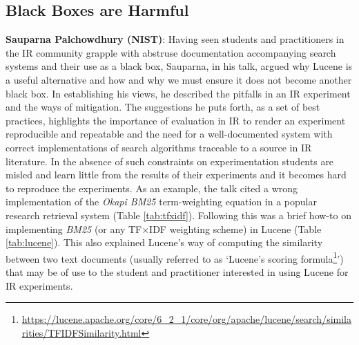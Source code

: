 \subsection*{Black Boxes are Harmful}

{\bf Sauparna Palchowdhury (NIST)}: Having seen students and
practitioners in the IR community grapple with abstruse documentation
accompanying search systems and their use as a black box, Sauparna, in
his talk, argued why Lucene is a useful alternative and how and why we
must ensure it does not become another black box. In establishing his
views, he described the pitfalls in an IR experiment and the ways of
mitigation. The suggestions he puts forth, as a set of best practices,
highlights the importance of evaluation in IR to render an experiment
reproducible and repeatable and the need for a well-documented system
with correct implementations of search algorithms traceable to a
source in IR literature. In the absence of such constraints on
experimentation students are misled and learn little from the results
of their experiments and it becomes hard to reproduce the
experiments. As an example, the talk cited a wrong implementation of
the \emph{Okapi BM25} term-weighting equation in a popular research
retrieval system (Table \ref{tab:tfxidf}). Following this was a brief
how-to on implementing \emph{BM25} (or any TF$\times$IDF weighting
scheme) in Lucene (Table \ref{tab:lucene}). This also explained
Lucene's way of computing the similarity between two text documents
(usually referred to as `Lucene's scoring
formula\footnote{\url{https://lucene.apache.org/core/6_2_1/core/org/apache/lucene/search/similarities/TFIDFSimilarity.html}}')
that may be of use to the student and practitioner interested in using
Lucene for IR experiments.

